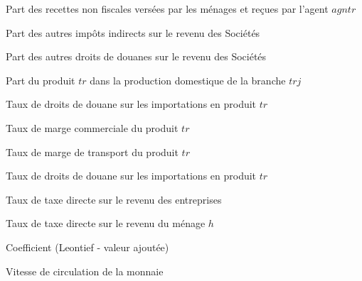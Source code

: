 \documentclass[11pt,a4paper]{article}
\newcommand{\agntr}{\mathit{agntr}}
\newcommand{\bns}{\mathit{bns}}
\newcommand{\sntx}{\mathit{sntx}}
\newcommand{\syfi}{\mathit{syfi}}
\newcommand{\syfm}{\mathit{syfm}}
\newcommand{\tm}{\mathit{tm}}
\newcommand{\tmgc}{\mathit{tmgc}}
\newcommand{\tmgt}{\mathit{tmgt}}
\newcommand{\tr}{\mathit{tr}}
\newcommand{\trj}{\mathit{trj}}
\newcommand{\tx}{\mathit{tx}}
\newcommand{\tyf}{\mathit{tyf}}
\newcommand{\tyh}{\mathit{tyh}}
\newcommand{\vel}{\mathit{vel}}
\begin{document}
\begin{description}[leftmargin=!,labelwidth=\widthof{\bfseries AAAAAAAA},parsep=10.5pt]
		\item[$\sntx_{\agntr}$] Part des recettes non fiscales versées par les ménages et reçues par l'agent $\agntr$
		
		\item[$\syfi$] Part des autres impôts indirects sur le revenu des Sociétés 
		
		\item[$\syfm$] Part des autres droits de douanes sur le revenu des Sociétés 
		
		\item[$\theta_{\tr,\trj}$] Part du produit $\tr$ dans la production domestique de la branche $\trj$
		
		\item[$\tm_{\tr}$] Taux de droits de douane sur les importations en produit $\tr$
		
		\item[$\tmgc_{\bns}$] Taux de marge commerciale du produit $\tr$
		
		\item[$\tmgt_{\bns}$] Taux de marge de transport du produit $\tr$
		
		\item[$\tx_{\tr}$] Taux de droits de douane sur les importations en produit $\tr$
		
		\item[$\tyf$] Taux de taxe directe sur le revenu des entreprises 
		
		\item[$\tyh_h$] Taux de taxe directe sur le revenu du ménage $h$
		
		\item[$v_j$] Coefficient (Leontief - valeur ajoutée)
		
		\item[$\vel$] Vitesse de circulation de la monnaie
\end{description}
	
	
\end{document}
